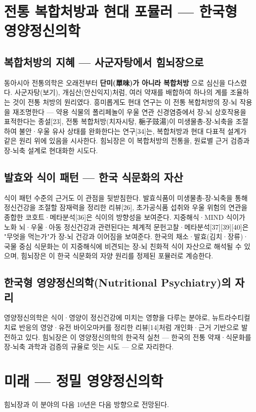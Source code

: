 \documentclass[11pt,oneside]{book}
\begin{document}
\section{전통 복합처방과 현대 포뮬러 — 한국형 영양정신의학}
\subsection{복합처방의 지혜 — 사군자탕에서 힘뇌장으로}
동아시아 전통의학은 오래전부터 \textbf{단미(單味)가 아니라 복합처방} 으로 심신을 다스렸다. 사군자탕(보기), 개심산(안신익지)처럼, 여러 약재를 배합하여 하나의 계를 조율하는 것이 전통 처방의 원리였다. 흥미롭게도 현대 연구는 이 전통 복합처방의 장-뇌 작용을 재조명한다 — 약용 식물의 폴리페놀이 우울 연관 신경염증에서 장-뇌 상호작용을 표적한다는 종설[23], 전통 복합처방(치자시탕, 梔子豉湯)이 미생물총-장-뇌축을 조절하여 불안·우울 유사 상태를 완화한다는 연구[34]는, 복합처방과 현대 다표적 설계가 같은 원리 위에 있음을 시사한다. 힘뇌장은 이 복합처방의 전통을, 원료별 근거 검증과 장-뇌축 설계로 현대화한 시도다.

\subsection{발효와 식이 패턴 — 한국 식문화의 자산}
식이 패턴 수준의 근거도 이 관점을 뒷받침한다. 발효식품이 미생물총-장-뇌축을 통해 정신건강을 조절할 잠재력을 정리한 리뷰[26], 초가공식품 섭취와 우울 위험의 연관을 종합한 코호트·메타분석[36]은 식이의 방향성을 보여준다. 지중해식·MIND 식이가 노화 뇌·우울·아동 정신건강과 관련된다는 체계적 문헌고찰·메타분석[37][39][40]은 "무엇을 먹는가"가 장-뇌 건강과 이어짐을 보여준다. 한국의 채소·발효(김치·장류)·국물 중심 식문화는 이 지중해식에 비견되는 장-뇌 친화적 식이 자산으로 해석될 수 있으며, 힘뇌장은 이 한국 식문화의 자양 원리를 정제된 포뮬러로 계승한다.

\subsection{한국형 영양정신의학(Nutritional Psychiatry)의 자리}
영양정신의학은 식이·영양이 정신건강에 미치는 영향을 다루는 분야로, 뉴트라수티컬 치료 반응의 영양·유전 바이오마커를 정리한 리뷰[14]처럼 개인화·근거 기반으로 발전하고 있다. 힘뇌장은 이 영양정신의학의 한국적 실천 — 한국의 전통 약재·식문화를 장-뇌축 과학과 검증의 규율로 잇는 시도 — 으로 자리한다.

\section{미래 — 정밀 영양정신의학}
힘뇌장과 이 분야의 다음 10년은 다음 방향으로 전망된다.
\end{document}
